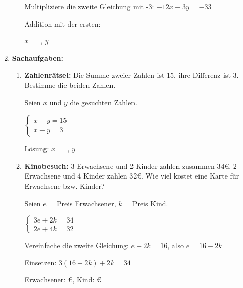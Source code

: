 \begin{enumerate}[label=\arabic*., resume]
\begin{enumerate}[label=\alph*)]
        Multipliziere die zweite Gleichung mit -3: $-12x - 3y = -33$

        Addition mit der ersten: \underline{\hspace{6cm}}

        $x =$ \underline{\hspace{1cm}}, $y =$ \underline{\hspace{1cm}}
    \end{enumerate}

    \vspace{1cm}

    \item \textbf{Sachaufgaben:}
    \vspace{0.5cm}

    \begin{enumerate}[label=\alph*)]
        \item \textbf{Zahlenrätsel:} Die Summe zweier Zahlen ist 15, ihre Differenz ist 3. Bestimme die beiden Zahlen.

        Seien $x$ und $y$ die gesuchten Zahlen.

        $\begin{cases} x + y = 15 \\ x - y = 3 \end{cases}$

        Lösung: $x =$ \underline{\hspace{2cm}}, $y =$ \underline{\hspace{2cm}}

        \vspace{0.8cm}
        \item \textbf{Kinobesuch:} 3 Erwachsene und 2 Kinder zahlen zusammen 34€. 2 Erwachsene und 4 Kinder zahlen 32€. Wie viel kostet eine Karte für Erwachsene bzw. Kinder?

        Seien $e$ = Preis Erwachsener, $k$ = Preis Kind.

        $\begin{cases} 3e + 2k = 34 \\ 2e + 4k = 32 \end{cases}$

        Vereinfache die zweite Gleichung: $e + 2k = 16$, also $e = 16 - 2k$

        Einsetzen: $3(16 - 2k) + 2k = 34$

        \underline{\hspace{8cm}}

        Erwachsener: \underline{\hspace{2cm}}€, Kind: \underline{\hspace{2cm}}€
    \end{enumerate}


\end{enumerate}
